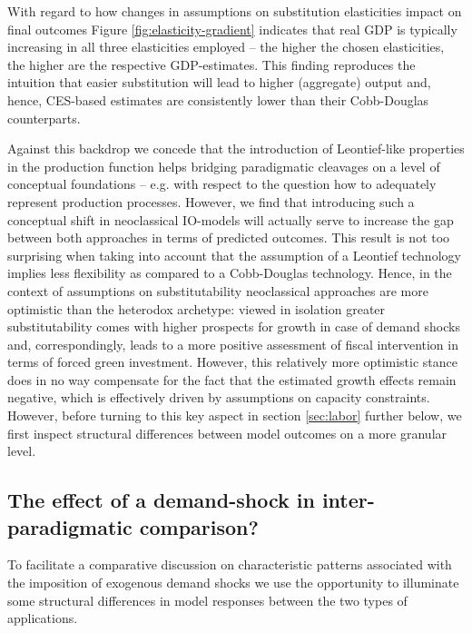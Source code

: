 With regard to how changes in assumptions on substitution elasticities impact on final outcomes Figure \ref{fig:elasticity-gradient} indicates that real GDP is typically increasing in all three elasticities employed -- the higher the chosen elasticities, the higher are the respective GDP-estimates. This finding reproduces the intuition that easier substitution will lead to higher (aggregate) output and, hence, CES-based estimates are consistently lower than their Cobb-Douglas counterparts.

Against this backdrop we concede that the introduction of Leontief-like properties in the production function helps bridging paradigmatic cleavages on a level of conceptual foundations -- e.g. with respect to the question how to adequately represent production processes. However, we find that introducing such a conceptual shift in neoclassical IO-models will actually serve to increase the gap between both approaches in terms of predicted outcomes. This result is not too surprising when taking into account that the assumption of a Leontief technology implies less flexibility as compared to a Cobb-Douglas technology. Hence, in the context of assumptions on substitutability neoclassical approaches are more optimistic than the heterodox archetype: viewed in isolation greater substitutability comes with higher prospects for growth in case of demand shocks and, correspondingly, leads to a more positive assessment of fiscal intervention in terms of forced green investment. However, this relatively more optimistic stance does in no way compensate for the fact that the estimated growth effects remain negative, which is effectively driven by assumptions on capacity constraints. However, before turning to this key aspect in section \ref{sec:labor} further below, we first inspect structural differences between model outcomes on a more granular level.

\subsection{The effect of a demand-shock in inter-paradigmatic comparison?}

To facilitate a comparative discussion on characteristic patterns associated with the imposition of exogenous demand shocks we use the opportunity to illuminate some structural differences in model responses between the two types of applications.


